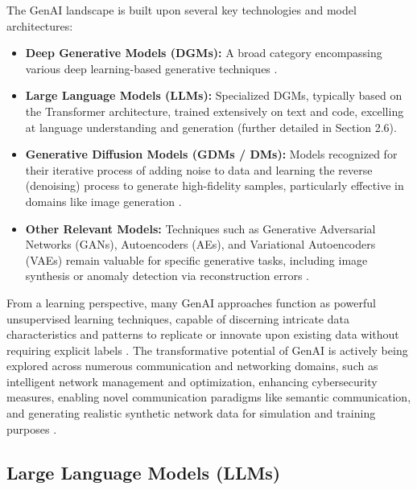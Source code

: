 \documentclass[sigconf]{acmart}
\begin{document}
The GenAI landscape is built upon several key technologies and model architectures:
\begin{itemize}
    \begin{itemize}
\item \textbf{Deep Generative Models (DGMs):} A broad category encompassing various deep learning-based generative techniques \cite{ref26}.
\end{itemize}
    \begin{itemize}
\item \textbf{Large Language Models (LLMs):} Specialized DGMs, typically based on the Transformer architecture, trained extensively on text and code, excelling at language understanding and generation \cite{ref26, ref29} (further detailed in Section 2.6).
\end{itemize}
    \begin{itemize}
\item \textbf{Generative Diffusion Models (GDMs / DMs):} Models recognized for their iterative process of adding noise to data and learning the reverse (denoising) process to generate high-fidelity samples, particularly effective in domains like image generation \cite{ref19, ref29, ref33}.
\end{itemize}
    \begin{itemize}
\item \textbf{Other Relevant Models:} Techniques such as Generative Adversarial Networks (GANs), Autoencoders (AEs), and Variational Autoencoders (VAEs) remain valuable for specific generative tasks, including image synthesis or anomaly detection via reconstruction errors \cite{ref5}.
\end{itemize}
\end{itemize}
From a learning perspective, many GenAI approaches function as powerful unsupervised learning techniques, capable of discerning intricate data characteristics and patterns to replicate or innovate upon existing data without requiring explicit labels \cite{ref20}. The transformative potential of GenAI is actively being explored across numerous communication and networking domains, such as intelligent network management and optimization, enhancing cybersecurity measures, enabling novel communication paradigms like semantic communication, and generating realistic synthetic network data for simulation and training purposes \cite{ref9, ref26, ref31}.

\subsection{Large Language Models (LLMs)}
\end{document}
